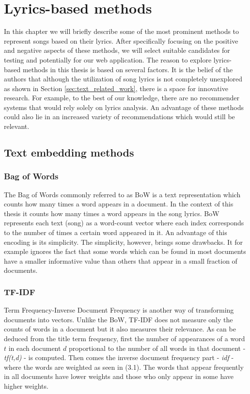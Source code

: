 \chapter{Lyrics-based methods}\label{chap:lyrics_methods}
 In this chapter we will briefly describe some of the most prominent methods to represent songs based on their lyrics. After specifically focusing on the positive and negative aspects of these methods, we will select suitable candidates for testing and potentially for our web application. The reason to explore lyrics-based methods in this thesis is based on several factors. It is the belief of the authors that although the utilization of song lyrics is not completely unexplored as shown in Section \ref{sec:text_related_work}, there is a space for innovative research. For example, to the best of our knowledge, there are no recommender systems that would rely solely on lyrics analysis. An advantage of these methods could also lie in an increased variety of recommendations which would still be relevant.

\section{Text embedding methods}
\subsection{Bag of Words}
The Bag of Words commonly referred to as BoW is a text representation which counts how many times a word appears in a document. In the context of this thesis it counts how many times a word appears in the song lyrics.
BoW represents each text (song) as a word-count vector where each index corresponds to the number of times a certain word appeared in it. An advantage of this encoding is its simplicity. The simplicity, however, brings some drawbacks. It for example ignores the fact that some words which can be found in most documents have a smaller informative value than others that appear in a small fraction of documents. 

\subsection{TF-IDF}
Term Frequency-Inverse Document Frequency is another way of transforming documents into vectors. Unlike the BoW, TF-IDF does not measure only the counts of words in a document but it also measures their relevance. As can be deduced from the title term frequency, first the number of appearances of a word $t$ in each document $d$ proportional to the number of all words in that document - \textit{tf(t,d)} - is computed. Then comes the inverse document frequency part - \textit{idf} - where the words are weighted as seen in (3.1). The words that appear frequently in all documents have lower weights and those who only appear in some have higher weights.

